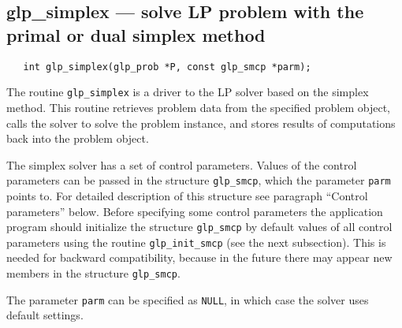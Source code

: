 \subsection{glp\_simplex --- solve LP problem with the primal or dual
simplex method}

\synopsis

\begin{verbatim}
   int glp_simplex(glp_prob *P, const glp_smcp *parm);
\end{verbatim}

\description

The routine \verb|glp_simplex| is a driver to the LP solver based on
the simplex method. This routine retrieves problem data from the
specified problem object, calls the solver to solve the problem
instance, and stores results of computations back into the problem
object.

The simplex solver has a set of control parameters. Values of the
control parameters can be passed in the structure \verb|glp_smcp|,
which the parameter \verb|parm| points to. For detailed description of
this structure see paragraph ``Control parameters'' below.
Before specifying some control parameters the application program
should initialize the structure \verb|glp_smcp| by default values of
all control parameters using the routine \verb|glp_init_smcp| (see the
next subsection). This is needed for backward compatibility, because in
the future there may appear new members in the structure
\verb|glp_smcp|.

The parameter \verb|parm| can be specified as \verb|NULL|, in which
case the solver uses default settings.

\returns

